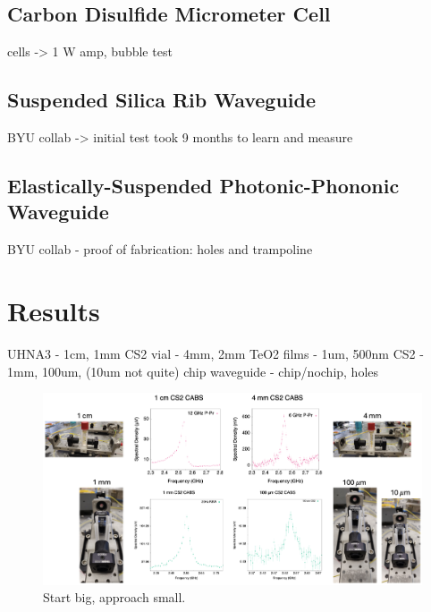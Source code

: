 \subsection{Carbon Disulfide Micrometer Cell}
\label{subsec:Raman:Target:CS2Cells}

cells -> 1 W amp, bubble test

\subsection{Suspended Silica Rib Waveguide}
\label{subsec:Raman:Target:Waveguide}

BYU collab -> initial test took 9 months to learn and measure

\subsection{Elastically-Suspended Photonic-Phononic Waveguide}
\label{subsec:Raman:Target:WigglyWaveguide}

BYU collab - proof of fabrication: holes and trampoline


\section{Results}
\label{sec:Raman:Results}

UHNA3 - 1cm, 1mm
CS2 vial - 4mm, 2mm
TeO2 films - 1um, 500nm
CS2 - 1mm, 100um, (10um not quite)
chip waveguide - chip/nochip, holes

\begin{figure}[t]
  \centering
  \includegraphics[width=\textwidth]{figs/4-Raman/StartBigApproachSmall.png}
  \caption{Start big, approach small.}
  \label{fig:StartBigApproachSmall}
\end{figure}

